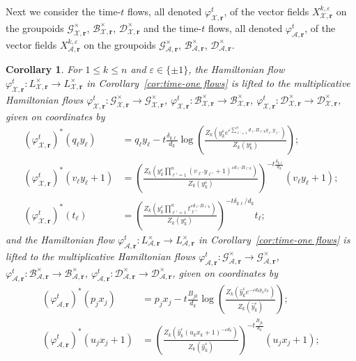 \documentclass{amsart}
\newtheorem{corollary}[theorem]{Corollary}
\numberwithin{equation}{section}
\newcommand{\bfr}{{\boldsymbol{r}}}
\newcommand{\cA}{\mathcal{A}}
\newcommand{\cB}{\mathcal{B}}
\newcommand{\cD}{\mathcal{D}}
\newcommand{\cG}{\mathcal{G}}
\newcommand{\cX}{\mathcal{X}}
\begin{document}
Next we consider the time-$t$ flows, all denoted $\varphi_{\cX,\bfr}^t$, of the vector fields $X_{\cX,\bfr}^{k,\varepsilon}$ on the groupoids $\cG^\times_{\cX,\bfr}$, $\cB^\times_{\cX,\bfr}$, $\cD^\times_{\cX,\bfr}$ and the time-$t$ flows, all denoted $\varphi_{\cA,\bfr}^t$, of the vector fields $X_{\cA,\bfr}^{k,\varepsilon}$ on the groupoids $\cG^\times_{\cA,\bfr}$, $\cB^\times_{\cA,\bfr}$, $\cD^\times_{\cA,\bfr}$.
\begin{corollary}
  \label{cor:groupoid hamiltonian flows}
  For $1\le k\le n$ and $\varepsilon\in\{\pm1\}$, the Hamiltonian flow $\varphi_{\cX,\bfr}^t: L^\times_{\cX,\bfr} \to L^\times_{\cX,\bfr}$ in Corollary~\ref{cor:time-one flows} is lifted to the multiplicative Hamiltonian flows $\varphi_{\cX,\bfr}^t: \cG^\times_{\cX,\bfr} \to \cG^\times_{\cX,\bfr}$, $\varphi_{\cX,\bfr}^t: \cB^\times_{\cX,\bfr} \to \cB^\times_{\cX,\bfr}$, $\varphi_{\cX,\bfr}^t: \cD^\times_{\cX,\bfr} \to \cD^\times_{\cX,\bfr}$, given on coordinates by
  \begin{align*}
    (\varphi_{\cX,\bfr}^t)^*(q_\ell y_\ell)&=q_\ell y_\ell-t\frac{\delta_{k\ell}}{d_k}\log\left(\frac{Z_k\left(y_k^\varepsilon e^{\varepsilon\sum_{\ell'=1}^n d_{\ell'} B_{\ell' k}q_{\ell'} y_{\ell'}}\right)}{Z_k(y_k^\varepsilon)}\right);\\
    (\varphi_{\cX,\bfr}^t)^*(v_\ell y_\ell + 1)&=\left(\frac{Z_k\left(y_k^\varepsilon \prod_{\ell'=1}^n (v_{\ell'} y_{\ell'} + 1)^{\varepsilon d_{\ell'} B_{\ell' k}}\right)}{Z_k(y_k^\varepsilon)}\right)^{-t\frac{\delta_{k\ell}}{d_k}}(v_\ell y_\ell+1);\\
    (\varphi_{\cX,\bfr}^t)^*(t_\ell)&=\left(\frac{Z_k\left(y_k^\varepsilon \prod_{\ell'=1}^n t_{\ell'}^{\varepsilon d_{\ell'} B_{\ell' k}}\right)}{Z_k(y_k^\varepsilon)}\right)^{-t\delta_{k\ell}/d_k}t_\ell;
  \end{align*}
  and the Hamiltonian flow $\varphi_{\cA,\bfr}^t: L^\times_{\cA,\bfr} \to L^\times_{\cA,\bfr}$ in Corollary~\ref{cor:time-one flows} is lifted to the multiplicative Hamiltonian flows $\varphi_{\cA,\bfr}^t: \cG^\times_{\cA,\bfr} \to \cG^\times_{\cA,\bfr}$, $\varphi_{\cA,\bfr}^t: \cB^\times_{\cA,\bfr} \to \cB^\times_{\cA,\bfr}$, $\varphi_{\cA,\bfr}^t: \cD^\times_{\cA,\bfr} \to \cD^\times_{\cA,\bfr}$, given on coordinates by
  \begin{align*}
    (\varphi_{\cA,\bfr}^t)^*(p_jx_j)&=p_jx_j-t\frac{B_{jk}}{d_k}\log\left(\frac{Z_k\left(\hat y_k^\varepsilon e^{-\varepsilon d_kp_kx_k}\right)}{Z_k(\hat y_k^\varepsilon)}\right);\\
    (\varphi_{\cA,\bfr}^t)^*(u_jx_j+1)&=\left(\frac{Z_k\left(\hat y_k^\varepsilon (u_kx_k+1)^{-\varepsilon d_k}\right)}{Z_k(\hat y_k^\varepsilon)}\right)^{-t\frac{B_{jk}}{d_k}}(u_jx_j+1);\\

\end{align*}
\end{corollary}
\end{document}
